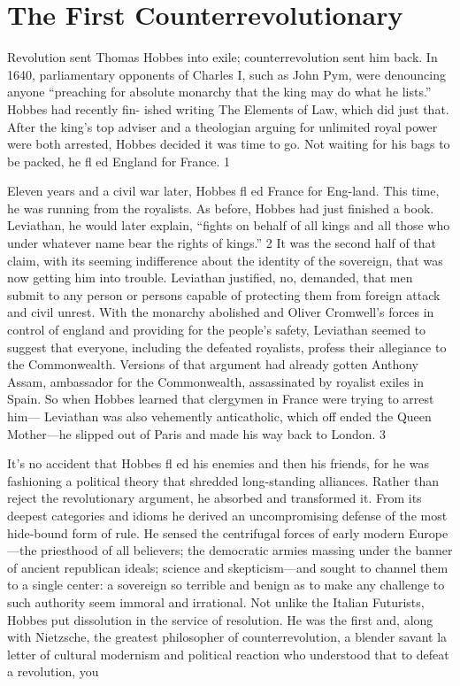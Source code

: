 {\chapter{The First Counterrevolutionary} } {\label{The First Counterrevolutionary} }{\par}{\textit{	} } {\par}{\par} {\textbf{\textit{	} } } {\par} 
	Revolution sent Thomas Hobbes into exile; counterrevolution sent him back. In 1640, parliamentary opponents of Charles I, such as John Pym, were denouncing anyone “preaching for absolute monarchy that the king may do what he lists.” Hobbes had recently fin- ished writing The Elements of Law, which did just that. After the king’s top adviser and a theologian arguing for unlimited royal power were both arrested, Hobbes decided it was time to go. Not waiting for his bags to be packed, he fl ed England for France. {\color{blue} 1 } {\par} Eleven years and a civil war later, Hobbes fl ed France for Eng-land. This time, he was running from the royalists. As before, Hobbes had just finished a book. Leviathan, he would later explain, “fights on behalf of all kings and all those who under whatever name bear the rights of kings.” {\color{blue} 2 } It was the second half of that claim, with its seeming indifference about the identity of the sovereign, that was now getting him into trouble. Leviathan justified, no, demanded, that men submit to any person or persons capable of protecting them from foreign attack and civil unrest. With the monarchy abolished and Oliver Cromwell’s forces in control of england and providing for the people’s safety, Leviathan seemed to suggest that everyone, including the defeated royalists, profess their allegiance to the Commonwealth. Versions of that argument had already gotten Anthony Assam, ambassador for the Commonwealth, assassinated by royalist exiles in Spain. So when Hobbes learned that clergymen in France were trying to arrest him— Leviathan was also vehemently anticatholic, which off ended the Queen Mother—he slipped out of Paris and made his way back to London. {\color{blue} 3 } {\par} It’s no accident that Hobbes fl ed his enemies and then his friends, for he was fashioning a political theory that shredded long-standing alliances. Rather than reject the revolutionary argument, he absorbed and transformed it. From its deepest categories and idioms he derived an uncompromising defense of the most hide-bound form of rule. He sensed the centrifugal forces of early modern Europe—the priesthood of all believers; the democratic armies massing under the banner of ancient republican ideals; science and skepticism—and sought to channel them to a single center: a sovereign so terrible and benign as to make any challenge to such authority seem immoral and irrational. Not unlike the Italian Futurists, Hobbes put dissolution in the service of resolution. He was the first and, along with Nietzsche, the greatest philosopher of counterrevolution, a blender savant la letter of cultural modernism and political reaction who understood that to defeat a revolution, you 